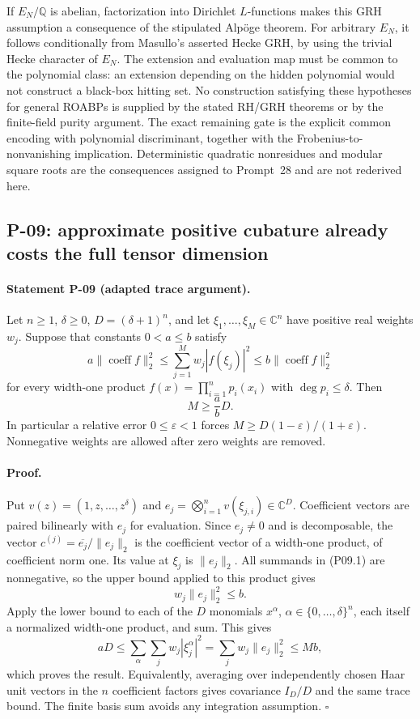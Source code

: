 \documentclass[11pt,a4paper]{article}
\theoremstyle{definition}\newtheorem{definition}{Definition}
\begin{document}
If $E_N/\mathbb Q$ is abelian, factorization into Dirichlet $L$-functions makes this GRH assumption a consequence of the stipulated Alp\"oge theorem. For arbitrary $E_N$, it follows conditionally from Masullo's asserted Hecke GRH, by using the trivial Hecke character of $E_N$. The extension and evaluation map must be common to the polynomial class: an extension depending on the hidden polynomial would not construct a black-box hitting set. No construction satisfying these hypotheses for general ROABPs is supplied by the stated RH/GRH theorems or by the finite-field purity argument. The exact remaining gate is the explicit common encoding with polynomial discriminant, together with the Frobenius-to-nonvanishing implication. Deterministic quadratic nonresidues and modular square roots are the consequences assigned to Prompt~28 and are not rederived here.

\subsection{P-09: approximate positive cubature already costs the full tensor dimension}
\paragraph{Statement P-09 (adapted trace argument).}
Let $n\ge1$, $\delta\ge0$, $D=(\delta+1)^n$, and let $\xi_1,\ldots,\xi_M\in\mathbb C^n$ have positive real weights $w_j$. Suppose that constants $0<a\le b$ satisfy
\[
 a\|\operatorname{coeff} f\|_2^2
 \le \sum_{j=1}^M w_j|f(\xi_j)|^2
 \le b\|\operatorname{coeff} f\|_2^2
 \tag{P09.1}
\]
for every width-one product $f(x)=\prod_{i=1}^n p_i(x_i)$ with $\deg p_i\le\delta$. Then
\[
 M\ge \frac{a}{b}D.
 \tag{P09.2}
\]
In particular a relative error $0\le\varepsilon<1$ forces
$M\ge D(1-\varepsilon)/(1+\varepsilon)$. Nonnegative weights are allowed after zero weights are removed.
\paragraph{Proof.}
Put $v(z)=(1,z,\ldots,z^\delta)$ and
$e_j=\bigotimes_{i=1}^n v(\xi_{j,i})\in\mathbb C^D$.
Coefficient vectors are paired bilinearly with $e_j$ for evaluation.
Since $e_j\ne0$ and is decomposable, the vector
$c^{(j)}=\overline{e_j}/\|e_j\|_2$ is the coefficient vector of a width-one product, of coefficient norm one. Its value at $\xi_j$ is $\|e_j\|_2$. All summands in (P09.1) are nonnegative, so the upper bound applied to this product gives
\[
 w_j\|e_j\|_2^2\le b.
\]
Apply the lower bound to each of the $D$ monomials $x^\alpha$, $\alpha\in\{0,\ldots,\delta\}^n$, each itself a normalized width-one product, and sum. This gives
\[
 aD\le\sum_\alpha\sum_j w_j|\xi_j^\alpha|^2
 =\sum_j w_j\|e_j\|_2^2\le Mb,
\]
which proves the result. Equivalently, averaging over independently chosen Haar unit vectors in the $n$ coefficient factors gives covariance $I_D/D$ and the same trace bound. The finite basis sum avoids any integration assumption. $\square$
\end{document}
